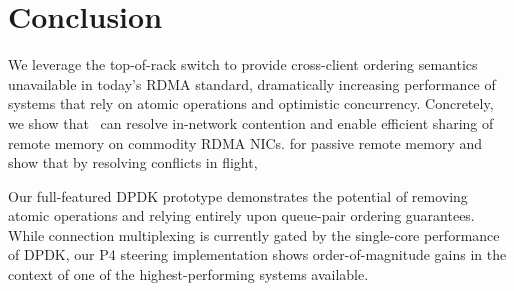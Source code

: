 \section{Conclusion}

We leverage the top-of-rack switch to provide cross-client
ordering semantics unavailable in today's RDMA standard,
dramatically increasing performance of systems that rely on
atomic operations and optimistic concurrency.  Concretely,
we show that \sword\ can resolve in-network contention and
enable efficient sharing of remote memory on commodity RDMA
NICs.  for passive remote memory and show that by resolving
conflicts in flight,

 Our full-featured DPDK prototype demonstrates the potential of
 removing atomic operations and relying entirely upon queue-pair
 ordering guarantees.  While connection multiplexing is currently
 gated by the single-core performance of DPDK, our P4 steering
 implementation shows order-of-magnitude gains in the context of one
 of the highest-performing systems available.

